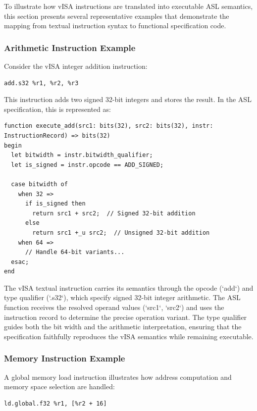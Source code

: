 To illustrate how vISA instructions are translated into executable ASL
semantics, this section presents several representative examples that
demonstrate the mapping from textual instruction syntax to functional
specification code.

\subsubsection{Arithmetic Instruction Example}

Consider the vISA integer addition instruction:
\begin{lstlisting}
add.s32 %r1, %r2, %r3
\end{lstlisting}

This instruction adds two signed 32-bit integers and stores the result. In the
ASL specification, this is represented as:

\begin{lstlisting}
function execute_add(src1: bits(32), src2: bits(32), instr: InstructionRecord) => bits(32)
begin
  let bitwidth = instr.bitwidth_qualifier;
  let is_signed = instr.opcode == ADD_SIGNED;
  
  case bitwidth of
    when 32 => 
      if is_signed then
        return src1 + src2;  // Signed 32-bit addition
      else
        return src1 +_u src2;  // Unsigned 32-bit addition
    when 64 => 
      // Handle 64-bit variants...
  esac;
end
\end{lstlisting}

The vISA textual instruction carries its semantics through the opcode (`add`)
and type qualifier (`.s32`), which specify signed 32-bit integer arithmetic.
The ASL function receives the resolved operand values (`src1`, `src2`) and uses
the instruction record to determine the precise operation variant. The type
qualifier guides both the bit width and the arithmetic interpretation, ensuring
that the specification faithfully reproduces the vISA semantics while remaining
executable.

\subsubsection{Memory Instruction Example}

A global memory load instruction illustrates how address computation and memory
space selection are handled:
\begin{lstlisting}
ld.global.f32 %r1, [%r2 + 16]
\end{lstlisting}


